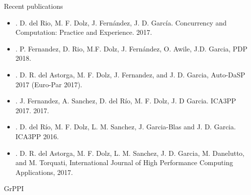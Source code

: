 \begin{frame}[t]{Recent publications}
\begin{scriptsize}
\begin{itemize}
\item
{}. 
D. del Rio, M. F. Dolz, J. Fernández, J. D. García. 
Concurrency and Computation: Practice and Experience. 
2017.
\vfill
\item
{}.
P. Fernandez, D. Rio, M.F. Dolz, J. Fernández, O. Awile, J.D. Garcia,
PDP 2018.
\item
{}.
D. R. del Astorga, M. F. Dolz, J. Fernandez, and J. D. Garcia, 
Auto-DaSP 2017 (Euro-Par 2017).
\item
{}.
J. Fernandez, A. Sanchez, D. del Río, M. F. Dolz, J. D Garcia.
ICA3PP 2017.
2017.
\item
{}. 
D. del Río, M. F. Dolz, L. M. Sanchez, J. Garcia-Blas and J. D. Garcia. 
ICA3PP 2016.
\item
{}.
D. R. del Astorga, M. F. Dolz, L. M. Sanchez, J. D. Garcia, M. Danelutto, and M. Torquati, 
International Journal of High Performance Computing Applications, 2017.
\end{itemize}
\end{scriptsize}
\end{frame}

\begin{frame}{GrPPI}
\begin{Large}
\end{Large}
\end{frame}
